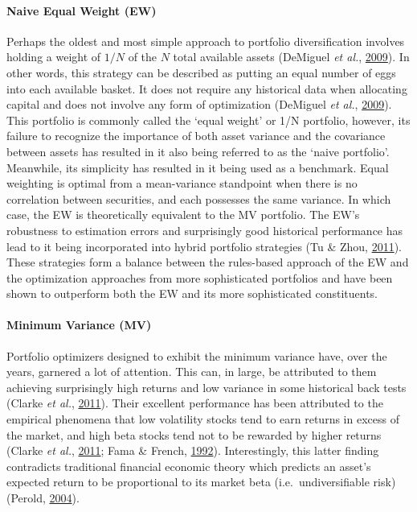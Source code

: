 \documentclass[11pt,preprint, authoryear]{elsarticle}
\numberwithin{equation}{section}
\numberwithin{figure}{section}
\numberwithin{table}{section}
\begin{document}
\hypertarget{naive-equal-weight-ew}{%
\paragraph{Naive Equal Weight (EW)}\label{naive-equal-weight-ew}}

Perhaps the oldest and most simple approach to portfolio diversification
involves holding a weight of \(1/N\) of the \(N\) total available assets
(DeMiguel \emph{et al.}, \protect\hyperlink{ref-demiguel2009}{2009}). In
other words, this strategy can be described as putting an equal number
of eggs into each available basket. It does not require any historical
data when allocating capital and does not involve any form of
optimization (DeMiguel \emph{et al.},
\protect\hyperlink{ref-demiguel2009}{2009}). This portfolio is commonly
called the `equal weight' or 1/N portfolio, however, its failure to
recognize the importance of both asset variance and the covariance
between assets has resulted in it also being referred to as the `naive
portfolio'. Meanwhile, its simplicity has resulted in it being used as a
benchmark. Equal weighting is optimal from a mean-variance standpoint
when there is no correlation between securities, and each possesses the
same variance. In which case, the EW is theoretically equivalent to the
MV portfolio. The EW's robustness to estimation errors and surprisingly
good historical performance has lead to it being incorporated into
hybrid portfolio strategies (Tu \& Zhou,
\protect\hyperlink{ref-tu2011}{2011}). These strategies form a balance
between the rules-based approach of the EW and the optimization
approaches from more sophisticated portfolios and have been shown to
outperform both the EW and its more sophisticated constituents.

\hypertarget{minimum-variance-mv}{%
\paragraph{Minimum Variance (MV)}\label{minimum-variance-mv}}

Portfolio optimizers designed to exhibit the minimum variance have, over
the years, garnered a lot of attention. This can, in large, be
attributed to them achieving surprisingly high returns and low variance
in some historical back tests (Clarke \emph{et al.},
\protect\hyperlink{ref-clarke2011}{2011}). Their excellent performance
has been attributed to the empirical phenomena that low volatility
stocks tend to earn returns in excess of the market, and high beta
stocks tend not to be rewarded by higher returns (Clarke \emph{et al.},
\protect\hyperlink{ref-clarke2011}{2011}; Fama \& French,
\protect\hyperlink{ref-fama1992}{1992}). Interestingly, this latter
finding contradicts traditional financial economic theory which predicts
an asset's expected return to be proportional to its market beta
(i.e.~undiversifiable risk) (Perold,
\protect\hyperlink{ref-perold2004}{2004}).
\end{document}
